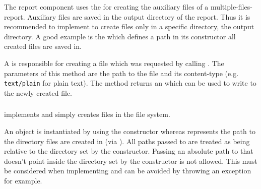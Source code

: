 The report component uses the  for creating the auxiliary files of a multiple-files-report. Auxiliary files are saved in the output directory of the report. Thus it is recommended to implement  to create files only in a specific directory, the output directory. A good example is the  which defines a path in its constructor all created files are saved in.

A  is responsible for creating a file which was requested by calling . The parameters of this method are the path to the file and its content-type (e.g. \texttt{text/plain} for plain text). The method returns an  which can be used to write to the newly created file.



\subsubsection{} \label{Classes:Report:DefaultFileCreationHandler}

 implements  and simply creates files in the file system.

An object is instantiated by using the constructor  whereas  represents the path to the directory files are created in (via ). All paths passed to  are treated as being relative to the directory set by the constructor. Passing an absolute path to  that doesn't point inside the directory set by the constructor is not allowed. This must be considered when implementing  and can be avoided by throwing an exception for example.


